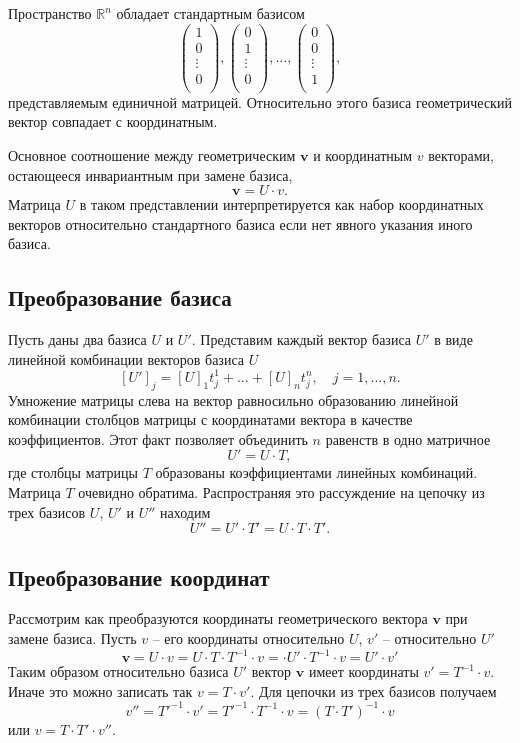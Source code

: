 \documentclass[a4paper]{article}
\begin{document}
Пространство $\mathbb R^n$ обладает стандартным базисом
$$
\left(
\begin{array}{c}
1 \\
0 \\
\vdots \\
0 \\
\end{array}
\right),
\left(
\begin{array}{c}
0 \\
1 \\
\vdots \\
0 \\
\end{array}
\right),
\dots,
\left(
\begin{array}{c}
0 \\
0 \\
\vdots \\
1 \\
\end{array}
\right),
$$
представляемым единичной матрицей. Относительно этого базиса геометрический вектор совпадает с координатным.

Основное соотношение между геометрическим $\mathbf v$ и координатным $v$ векторами, остающееся инвариантным при замене базиса,
$$
\mathbf v = U \cdot v.
$$
Матрица $U$ в таком представлении интерпретируется как набор координатных векторов относительно стандартного базиса если нет явного указания иного базиса.


\subsection{Преобразование базиса}
Пусть даны два базиса $U$ и $U'$. Представим каждый вектор базиса $U'$ в виде линейной комбинации векторов базиса $U$
$$
[U']_j = [U]_1 t^1_j + \ldots + [U]_n t^n_j, \quad j = 1, \ldots, n.
$$
Умножение матрицы слева на вектор равносильно образованию линейной комбинации столбцов матрицы с координатами вектора в качестве коэффициентов. Этот факт позволяет объединить $n$ равенств в одно матричное
$$
U' = U \cdot T,
$$
где столбцы матрицы $T$ образованы коэффициентами линейных комбинаций. Матрица $T$ очевидно обратима. Распространяя это рассуждение на цепочку из трех базисов $U$, $U'$ и $U''$ находим
$$
U'' = U' \cdot T' = U \cdot T \cdot T'.
$$ 



\subsection{Преобразование координат}
Рассмотрим как преобразуются координаты геометрического вектора $\mathbf v$ при замене базиса. Пусть $v$ -- его координаты относительно $U$, $v'$ -- относительно $U'$
$$
\mathbf v = U \cdot v = U \cdot T \cdot T^{-1} \cdot v = \cdot U' \cdot T^{-1} \cdot v = U' \cdot v'
$$
Таким образом относительно базиса $U'$ вектор $\mathbf v$ имеет координаты $v' = T^{-1} \cdot v$. Иначе это можно записать так $v = T \cdot v'$. Для цепочки из трех базисов получаем
$$
v'' = T'^{-1} \cdot v' = T'^{-1} \cdot T^{-1} \cdot v = (T \cdot T')^{-1} \cdot v
$$
или $v = T \cdot T' \cdot v''$.
\end{document}
